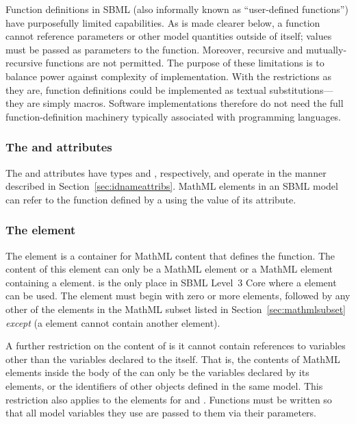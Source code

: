 Function definitions in SBML (also informally known as
``user-defined functions'') have purposefully limited capabilities.
As is made clearer below, a function cannot reference
parameters or other model quantities outside of itself; values
must be passed as parameters to the function.  Moreover, recursive
and mutually-recursive functions are not permitted.  The purpose
of these limitations is to balance power against complexity of
implementation.  With the restrictions as they are, function
definitions could be implemented as textual substitutions---they
are simply macros.  Software implementations therefore do not need
the full function-definition machinery typically associated with
programming languages.


\subsubsection{The  and  attributes}

The  and  attributes have types 
and , respectively, and operate in the manner
described in Section~\ref{sec:idnameattribs}.  MathML 
elements in an SBML model can refer to the function defined by a
\FunctionDefinition using the value of its  attribute.


\subsubsection{The  element}
\label{sec:function-definition-math}

The  element is a container for MathML content that
defines the function.  The content of this element can only be a
MathML  element or a MathML 
element containing a  element.  \FunctionDefinition
is the only place in SBML Level~3 Core where a 
element can be used.  The  element must begin with
zero or more  elements, followed by any other of the
elements in the MathML subset listed in
Section~\ref{sec:mathmlsubset} \emph{except}  (\ie a
 element cannot contain another 
element).

A further restriction on the content of  is it cannot
contain references to variables other than the variables declared
to the  itself.  That is, the contents of MathML
 elements inside the body of the  can only
be the variables declared by its  elements, or the
identifiers of other \FunctionDefinition{} objects defined in the
same model.  This restriction also applies to the 
elements for  and .  Functions
must be written so that all model variables they use are passed to
them via their parameters.


